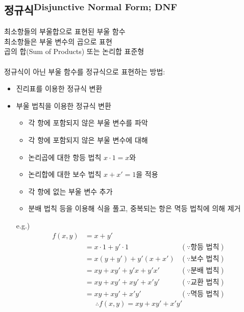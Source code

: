 \subsection{정규식\textsuperscript{Disjunctive Normal Form; DNF}}
최소항들의 부울합으로 표현된 부울 함수\\
최소항들은 부울 변수의 곱으로 표현\\
곱의 합(Sum of Products) 또는 논리합 표준형
\\\\
정규식이 아닌 부울 함수를 정규식으로 표현하는 방법:
\begin{itemize}
    \item 진리표를 이용한 정규식 변환
    \item 부울 법칙을 이용한 정규식 변환
          \begin{itemize}
              \item 각 항에 포함되지 않은 부울 변수를 파악
              \item 각 항에 포함되지 않은 부울 변수에 대해
              \item 논리곱에 대한 항등 법칙 $x \cdot 1 = x$와
              \item 논리합에 대한 보수 법칙 $x + x' = 1$을 적용
              \item 각 항에 없는 부울 변수 추가
              \item 분배 법칙 등을 이용해 식을 풀고, 중복되는 항은 멱등 법칙에 의해 제거
          \end{itemize}
          e.g.) \begin{align*}
              f(x, y) & = x + y'                  &                         \\
                      & = x\cdot 1 + y' \cdot 1   & (\because \text{항등 법칙}) \\
                      & = x(y + y') + y' (x + x') & (\because \text{보수 법칙}) \\
                      & = xy + xy' + y'x + y'x'   & (\because \text{분배 법칙}) \\
                      & = xy + xy' + xy' + x'y'   & (\because \text{교환 법칙}) \\
                      & = xy + xy' + x'y'         & (\because \text{멱등 법칙})
          \end{align*}
          $$\therefore f(x, y) = xy + xy' + x'y'$$
\end{itemize}

